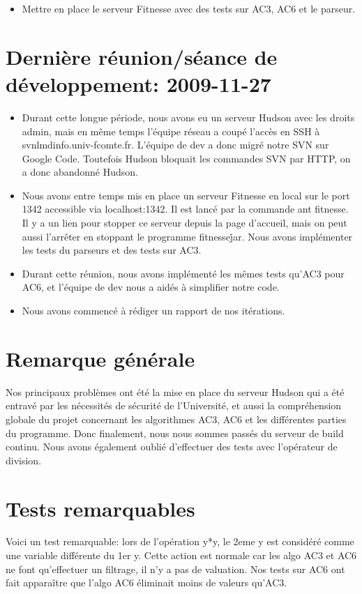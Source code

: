 \documentclass[a4paper,12pt]{article}
\begin{document}
\begin{itemize}
 \item Mettre en place le serveur Fitnesse avec des tests sur AC3, AC6 et le parseur.
\end{itemize}


\section{Dernière réunion/séance de développement: 2009-11-27}

\begin{itemize}

\item Durant cette longue période, nous avons eu un serveur Hudson avec les droits admin, mais en même temps l'équipe réseau a coupé l'accès en SSH à svnlmdinfo.univ-fcomte.fr.
L'équipe de dev a donc migré notre SVN sur Google Code. Toutefois Hudson bloquait les commandes SVN par HTTP, on a donc abandonné Hudson.

 \item Nous avons entre temps mis en place un serveur Fitnesse en local sur le port 1342 accessible via localhost:1342. Il est lancé par la commande ant fitnesse.
 Il y a un lien pour stopper ce serveur depuis la page d'accueil, mais on peut aussi l'arrêter en stoppant le programme fitnesse\.jar.
 Nous avons implémenter les tests du parseurs et des tests sur AC3.

 \item Durant cette réunion, nous avons implémenté les mêmes tests qu'AC3 pour AC6, et l'équipe de dev nous a aidés à simplifier notre code.

\item Nous avons commencé à rédiger un rapport de nos itérations.

\end{itemize}

\section{Remarque générale}

Nos principaux problèmes ont été la mise en place du serveur Hudson qui a été entravé par les nécessités de sécurité de l'Université, et 
aussi la compréhension globale du projet concernant les algorithmes AC3, AC6 et les différentes parties du programme.
Donc finalement, nous nous sommes passés du serveur de build continu. Nous avons également oublié d'effectuer des tests avec l'opérateur de division.

\section{Tests remarquables}

Voici un test remarquable: lors de l'opération y*y, le 2eme y est considéré comme une variable différente du 1er y.
Cette action est normale car les algo AC3 et AC6 ne font qu'effectuer un filtrage, il n'y a pas de valuation.
Nos tests sur AC6 ont fait apparaître que l'algo AC6 éliminait moins de valeurs qu'AC3.
\end{document}
